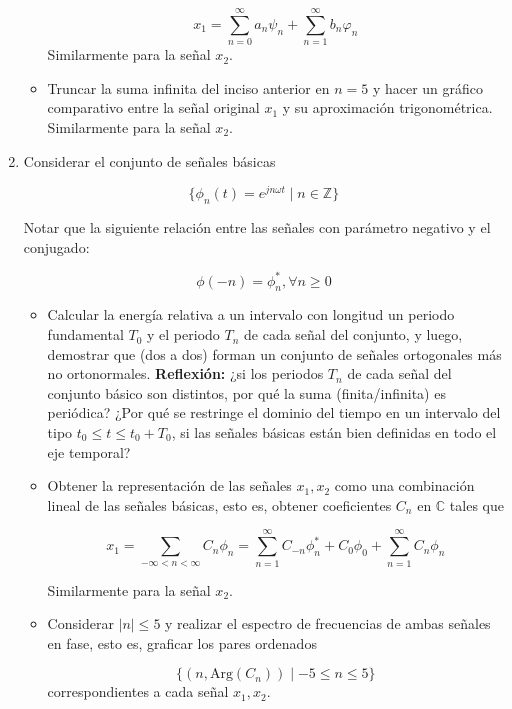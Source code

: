 \documentclass[12pt,a4paper]{report}
\begin{document}
\begin{enumerate}[label=\alph*)]
\begin{itemize}
     $$x_1 = \sum_{n=0}^{\infty} a_n \psi_n + \sum_{n=1}^{\infty} b_n \varphi_n$$
     Similarmente para la señal $x_2$.

   \item Truncar la suma infinita del inciso anterior en $n = 5$ y hacer un gráfico comparativo entre la señal 
     original $x_1$ y su aproximación trigonométrica. Similarmente para la señal $x_2$.

  \end{itemize}

  \item Considerar el conjunto de señales básicas

  $$\{\phi_n(t) = e^{jn\omega t} \mid n \in \mathbb{Z}\}$$

  Notar que la siguiente relación entre las señales con parámetro negativo y el conjugado:

  $$\phi(-n) = \phi_n^*, \forall n \geq 0$$

  \begin{itemize}

    \item Calcular la energía relativa a un intervalo con longitud un periodo fundamental $T_0$ y el periodo $T_n$ de
      cada señal del conjunto, y luego, demostrar que (dos a dos) forman un conjunto de señales ortogonales más no
      ortonormales.\newline
      \textbf{Reflexión:} ¿si los periodos $T_n$ de cada señal del conjunto básico son distintos, por qué la suma
      (finita/infinita) es periódica? ¿Por qué se restringe el dominio del tiempo en un intervalo del tipo 
      $t_0 \leq t \leq t_0 + T_0$, si las señales básicas están bien definidas en todo el eje temporal?

    \item Obtener la representación de las señales $x_1, x_2$ como una combinación lineal de las señales básicas, esto 
      es, obtener coeficientes $C_n$ en $\mathbb{C}$ tales que

      $$x_1 = \sum_{-\infty < n < \infty} C_n \phi_n =
      \sum_{n=1}^{\infty} C_{-n} \phi_n^* + C_0 \phi_0 + \sum_{n=1}^{\infty} C_n \phi_n$$

      Similarmente para la señal $x_2$.

    \item Considerar $|n| \leq 5$ y realizar el espectro de frecuencias de ambas señales en fase, esto es, graficar los 
      pares ordenados

      $$\{(n, \text{Arg}(C_n)) \mid -5 \leq n \leq 5\}$$
      correspondientes a cada señal $x_1, x_2$.


\end{itemize}
\end{enumerate}
\end{document}
